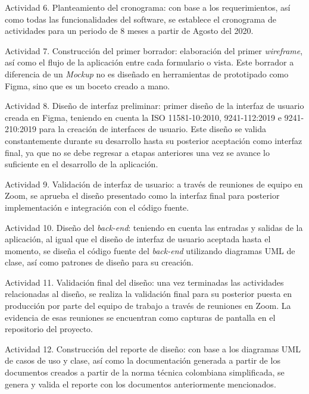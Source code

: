 \begin{APAitemize}
    \item Actividad 6. Planteamiento del cronograma: con base a los requerimientos, así como todas las funcionalidades del software, se establece el cronograma de actividades para un periodo de 8 meses a partir de Agosto del 2020.
    \item Actividad 7. Construcción del primer borrador: elaboración del primer \textit{wireframe}, así como el flujo de la aplicación entre cada formulario o vista. Este borrador a diferencia de un \textit{Mockup} no es diseñado en herramientas de prototipado como Figma, sino que es un boceto creado a mano.
    \item Actividad 8. Diseño de interfaz preliminar: primer diseño de la interfaz de usuario creada en Figma, teniendo en cuenta la ISO 11581-10:2010, 9241-112:2019 e 9241-210:2019 para la creación de interfaces de usuario. Este diseño se valida constantemente durante su desarrollo hasta su posterior aceptación como interfaz final, ya que no se debe regresar a etapas anteriores una vez se avance lo suficiente en el desarrollo de la aplicación.
    \item Actividad 9. Validación de interfaz de usuario: a través de reuniones de equipo en Zoom, se aprueba el diseño presentado como la interfaz final para posterior implementación e integración con el código fuente.
    \item Actividad 10. Diseño del \textit{back-end}: teniendo en cuenta las entradas y salidas de la aplicación, al igual que el diseño de interfaz de usuario aceptada hasta el momento, se diseña el código fuente del \textit{back-end} utilizando diagramas UML de clase, así como patrones de diseño para su creación.
    \item Actividad 11. Validación final del diseño: una vez terminadas las actividades relacionadas al diseño, se realiza la validación final para su posterior puesta en producción por parte del equipo de trabajo a través de reuniones en Zoom. La evidencia de esas reuniones se encuentran como capturas de pantalla en el repositorio del proyecto.
    \item Actividad 12. Construcción del reporte de diseño: con base a los diagramas UML de casos de uso y clase, así como la documentación generada a partir de los documentos creados a partir de la norma técnica colombiana simplificada, se genera y valida el reporte con los documentos anteriormente mencionados.
\end{APAitemize}

